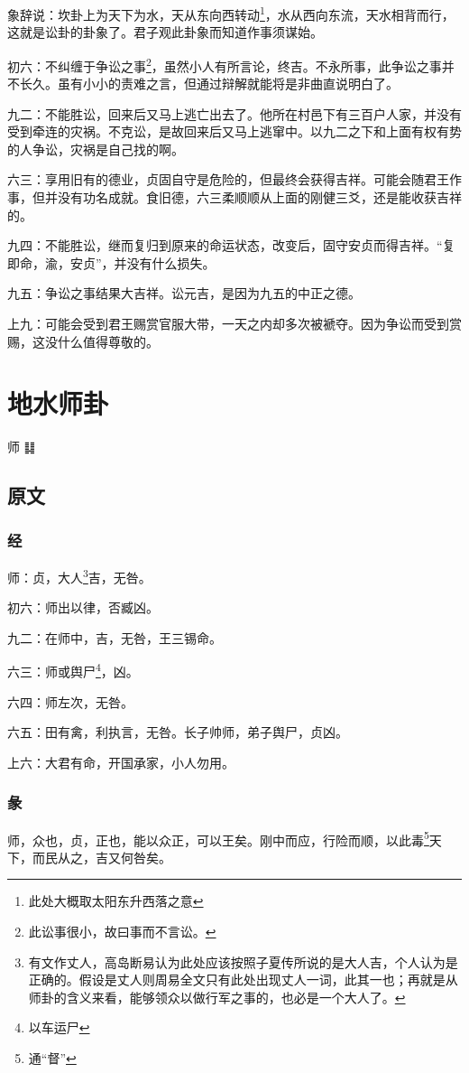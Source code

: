 \documentclass[12pt,oneside]{book}
\begin{document}
象辞说：坎卦上为天下为水，天从东向西转动\footnote{此处大概取太阳东升西落之意}，水从西向东流，天水相背而行，这就是讼卦的卦象了。君子观此卦象而知道作事须谋始。

初六：不纠缠于争讼之事\footnote{此讼事很小，故曰事而不言讼。}，虽然小人有所言论，终吉。不永所事，此争讼之事并不长久。虽有小小的责难之言，但通过辩解就能将是非曲直说明白了。

九二：不能胜讼，回来后又马上逃亡出去了。他所在村邑下有三百户人家，并没有受到牵连的灾祸。不克讼，是故回来后又马上逃窜中。以九二之下和上面有权有势的人争讼，灾祸是自己找的啊。

六三：享用旧有的德业，贞固自守是危险的，但最终会获得吉祥。可能会随君王作事，但并没有功名成就。食旧德，六三柔顺顺从上面的刚健三爻，还是能收获吉祥的。

九四：不能胜讼，继而复归到原来的命运状态，改变后，固守安贞而得吉祥。“复即命，渝，安贞”，并没有什么损失。

九五：争讼之事结果大吉祥。讼元吉，是因为九五的中正之德。

上九：可能会受到君王赐赏官服大带，一天之内却多次被褫夺。因为争讼而受到赏赐，这没什么值得尊敬的。



\chapter{地水师卦}
师 {\Large ䷆}

\section{原文}
\subsection{经}
师：贞，大人\footnote{有文作丈人，高岛断易认为此处应该按照子夏传所说的是大人吉，个人认为是正确的。假设是丈人则周易全文只有此处出现丈人一词，此其一也；再就是从师卦的含义来看，能够领众以做行军之事的，也必是一个大人了。}吉，无咎。

初六：师出以律，否臧凶。

九二：在师中，吉，无咎，王三锡命。

六三：师或舆尸\footnote{以车运尸}，凶。

六四：师左次，无咎。

六五：田有禽，利执言，无咎。长子帅师，弟子舆尸，贞凶。

上六：大君有命，开国承家，小人勿用。

\subsection{彖}
师，众也，贞，正也，能以众正，可以王矣。刚中而应，行险而顺，以此毒\footnote{通“督”}天下，而民从之，吉又何咎矣。
\end{document}
